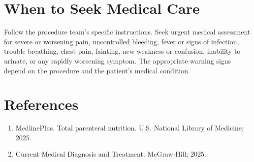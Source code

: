 \section*{When to Seek Medical Care}
Follow the procedure team's specific instructions. Seek urgent medical assessment for severe or worsening pain, uncontrolled bleeding, fever or signs of infection, trouble breathing, chest pain, fainting, new weakness or confusion, inability to urinate, or any rapidly worsening symptom. The appropriate warning signs depend on the procedure and the patient's medical condition.

\section*{References}
\begin{enumerate}
  \item MedlinePlus. Total parenteral nutrition. U.S. National Library of Medicine; 2025.
  \item Current Medical Diagnosis and Treatment. McGraw-Hill; 2025.
\end{enumerate}

\clearpage
